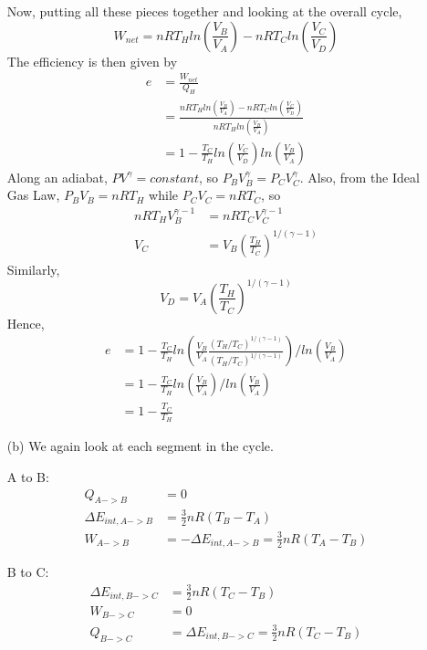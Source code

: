 \documentclass{article}
\begin{document}
\begin{itemize}
	Now, putting all these pieces together and looking at the overall cycle,
	\begin{equation}
	W_{net} = nRT_Hln\left(\frac{V_B}{V_A}\right)-nRT_Cln\left(\frac{V_C}{V_D}\right)
	\end{equation}
	The efficiency is then given by
	\begin{align*}
	e &= \frac{W_{net}}{Q_H} \\
	&= \frac{nRT_Hln\left(\frac{V_B}{V_A}\right)-nRT_Cln\left(\frac{V_C}{V_D}\right)}{nRT_Hln\left(\frac{V_B}{V_A}\right)} \\
	&= 1-\frac{T_C}{T_H}ln\left(\frac{V_C}{V_D}\right)ln\left(\frac{V_B}{V_A}\right)
	\end{align*}
	Along an adiabat, $PV^{\gamma} = constant$, so $P_BV_B^{\gamma} = P_CV_C^{\gamma}$. Also, from the Ideal Gas Law, $P_BV_B = nRT_H$ while $P_CV_C = nRT_C$, so
	\begin{align*}
	nRT_HV_B^{\gamma-1} &= nRT_CV_C^{\gamma-1} \\
	V_C &= V_B\left(\frac{T_H}{T_C}\right)^{1/(\gamma-1)}
	\end{align*}
	Similarly,
	\begin{equation}
	V_D = V_A\left(\frac{T_H}{T_C}\right)^{1/(\gamma-1)}
	\end{equation}
	Hence,
	\begin{align*}
	e &= 1-\frac{T_C}{T_H}ln\left(\frac{V_B}{V_A}\frac{(T_H/T_C)^{1/(\gamma-1)}}{(T_H/T_C)^{1/(\gamma-1)}}\right)/ln\left(\frac{V_B}{V_A}\right) \\
	&= 1-\frac{T_C}{T_H}ln\left(\frac{V_B}{V_A}\right)/ln\left(\frac{V_B}{V_A}\right) \\
	&= 1-\frac{T_C}{T_H}
	\end{align*}
	\item[(b)] We again look at each segment in the cycle.
	
	A to B:
	\begin{align*}
	Q_{A->B} &= 0 \\
	\Delta E_{int,A->B} &= \frac{3}{2}nR(T_B-T_A) \\
	W_{A->B} &= -\Delta E_{int,A->B} = \frac{3}{2}nR(T_A-T_B)
	\end{align*}
	
	B to C:
	\begin{align*}
	\Delta E_{int,B->C} &= \frac{3}{2}nR(T_C-T_B) \\
	W_{B->C} &= 0 \\
	Q_{B->C} &= \Delta E_{int,B->C} = \frac{3}{2}nR(T_C-T_B)
	\end{align*}
	

\end{itemize}
\end{document}
